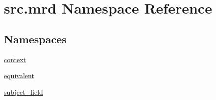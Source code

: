 \hypertarget{namespacesrc_1_1mrd}{\section{src.\+mrd Namespace Reference}
\label{namespacesrc_1_1mrd}
}
\subsection*{Namespaces}
\begin{DoxyCompactItemize}
\item 
 \hyperlink{namespacesrc_1_1mrd_1_1context}{context}
\item 
 \hyperlink{namespacesrc_1_1mrd_1_1equivalent}{equivalent}
\item 
 \hyperlink{namespacesrc_1_1mrd_1_1subject__field}{subject\+\_\+field}
\end{DoxyCompactItemize}
